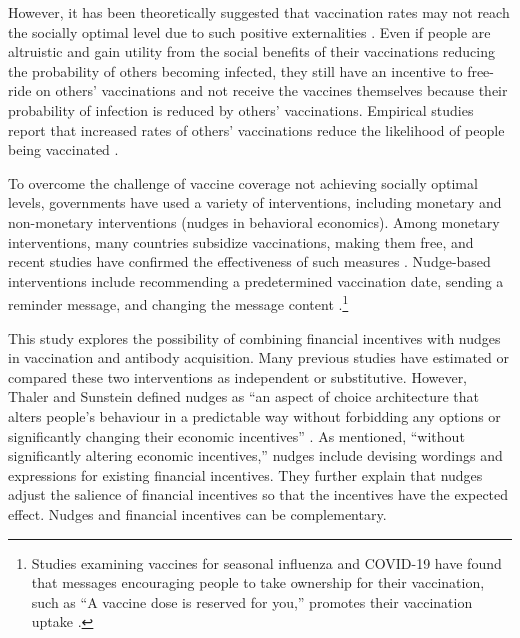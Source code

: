 \documentclass[
      12pt,
    a4paper
]{article}
\begin{document}
However, it has been theoretically suggested that vaccination rates may not reach the socially optimal level due to such positive externalities \citep{Brito1991a, Francis1997, Stiglitz2000}. Even if people are altruistic and gain utility from the social benefits of their vaccinations reducing the probability of others becoming infected, they still have an incentive to free-ride on others' vaccinations and not receive the vaccines themselves because their probability of infection is reduced by others' vaccinations. Empirical studies report that increased rates of others' vaccinations reduce the likelihood of people being vaccinated \citep{Hershey1994, Ibuka2014}.

To overcome the challenge of vaccine coverage not achieving socially optimal levels, governments have used a variety of interventions, including monetary and non-monetary interventions (nudges in behavioral economics). Among monetary interventions, many countries subsidize vaccinations, making them free, and recent studies have confirmed the effectiveness of such measures \citep{Barber2022, Brehm2022}. Nudge-based interventions include recommending a predetermined vaccination date, sending a reminder message, and changing the message content \citep{Chapman2010, Sasaki2022, Yokum2018}.\footnote{Studies examining vaccines for seasonal influenza and COVID-19 have found that messages encouraging people to take ownership for their vaccination, such as ``A vaccine dose is reserved for you,'' promotes their vaccination uptake \citep{Dai2021, Milkman2021}.}

This study explores the possibility of combining financial incentives with nudges in vaccination and antibody acquisition. Many previous studies have estimated or compared these two interventions as independent or substitutive. However, Thaler and Sunstein defined nudges as ``an aspect of choice architecture that alters people's behaviour in a predictable way without forbidding any options or significantly changing their economic incentives'' \citep[p.6]{Thaler2009}. As mentioned, ``without significantly altering economic incentives,'' nudges include devising wordings and expressions for existing financial incentives. They further explain that nudges adjust the salience of financial incentives so that the incentives have the expected effect. Nudges and financial incentives can be complementary.
\end{document}

